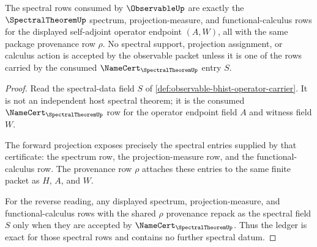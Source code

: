 \begin{theorem}
\label{thm:observable-spectral-data-ledger}
The spectral rows consumed by $\ObservableUp$ are exactly the
$\SpectralTheoremUp$ spectrum, projection-measure, and functional-calculus
rows for the displayed self-adjoint operator endpoint $(A,W)$, all with the
same package provenance row $\rho$. No spectral support, projection
assignment, or calculus action is accepted by the observable packet unless it
is one of the rows carried by the consumed $\NameCert_{\SpectralTheoremUp}$
entry $S$.
\end{theorem}
\begin{proof}
Read the spectral-data field $S$ of
\autoref{def:observable-bhist-operator-carrier}. It is not an independent host
spectral theorem; it is the consumed $\NameCert_{\SpectralTheoremUp}$ row for
the operator endpoint field $A$ and witness field $W$.

The forward projection exposes precisely the spectral entries supplied by
that certificate: the spectrum row, the projection-measure row, and the
functional-calculus row. The provenance row $\rho$ attaches these entries to
the same finite packet as $H$, $A$, and $W$.

For the reverse reading, any displayed spectrum, projection-measure, and
functional-calculus rows with the shared $\rho$ provenance repack as the
spectral field $S$ only when they are accepted by
$\NameCert_{\SpectralTheoremUp}$. Thus the ledger is exact for those spectral
rows and contains no further spectral datum.
\end{proof}

